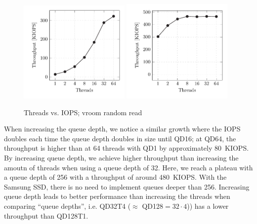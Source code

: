 \begin{figure}[H]
  \centering
   {\includegraphics[width=0.48\textwidth]{figures/vroom-iops-thread} \label{fig:vroom-iops-thread-qd1}}
   {\includegraphics[width=0.48\textwidth]{figures/vroom-iops-thread-qd32} \label{fig:vroom-iops-thread-qd32}}
  \caption{Threads vs. IOPS; vroom random read}
  \label{fig:vroom-iops-thread}
\end{figure}

When increasing the queue depth, we notice a similar growth where the IOPS doubles each time the queue depth doubles in size until QD16; at QD64, the throughput is higher than at 64 threads with QD1 by approximately \qty{80}{KIOPS}. By increasing queue depth, we achieve higher throughput than increasing the amoutn of threads when using a queue depth of 32. Here, we reach a plateau with a queue depth of 256 with a throughput of around \qty{480}{KIOPS}. With the Samsung SSD, there is no need to implement queues deeper than 256. Increasing queue depth leads to better performance than increasing the threads when comparing ``queue depths'', i.e. QD32T4 ($\approx$ QD128$=32 \cdot 4$)) has a lower throughput than QD128T1.

